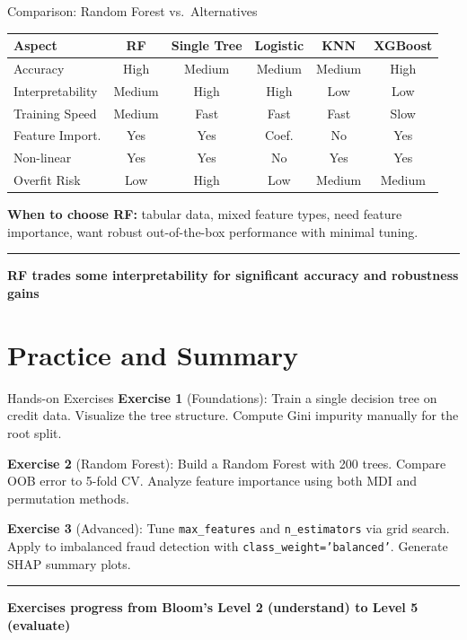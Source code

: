 \documentclass[8pt,aspectratio=169]{beamer}
\newcommand{\bottomnote}[1]{%
\vfill
\vspace{-2mm}
\textcolor{mllavender2}{\rule{\textwidth}{0.4pt}}
\vspace{1mm}
\footnotesize
\textbf{#1}
}
\begin{document}
\begin{frame}[t]{Comparison: Random Forest vs.\ Alternatives}
\begin{center}
\small
\begin{tabular}{l|ccccc}
\toprule
\textbf{Aspect} & \textbf{RF} & \textbf{Single Tree} & \textbf{Logistic} & \textbf{KNN} & \textbf{XGBoost} \\
\midrule
Accuracy & High & Medium & Medium & Medium & High \\
Interpretability & Medium & High & High & Low & Low \\
Training Speed & Medium & Fast & Fast & Fast & Slow \\
Feature Import. & Yes & Yes & Coef. & No & Yes \\
Non-linear & Yes & Yes & No & Yes & Yes \\
Overfit Risk & Low & High & Low & Medium & Medium \\
\bottomrule
\end{tabular}
\end{center}

\vspace{0.3em}
\textbf{When to choose RF:} tabular data, mixed feature types, need feature importance, want robust out-of-the-box performance with minimal tuning.
\bottomnote{RF trades some interpretability for significant accuracy and robustness gains}
\end{frame}

\section{Practice and Summary}

\begin{frame}[t]{Hands-on Exercises}
\textbf{Exercise 1} (Foundations): Train a single decision tree on credit data. Visualize the tree structure. Compute Gini impurity manually for the root split.

\vspace{0.5em}
\textbf{Exercise 2} (Random Forest): Build a Random Forest with 200 trees. Compare OOB error to 5-fold CV. Analyze feature importance using both MDI and permutation methods.

\vspace{0.5em}
\textbf{Exercise 3} (Advanced): Tune \texttt{max\_features} and \texttt{n\_estimators} via grid search. Apply to imbalanced fraud detection with \texttt{class\_weight='balanced'}. Generate SHAP summary plots.
\bottomnote{Exercises progress from Bloom's Level 2 (understand) to Level 5 (evaluate)}
\end{frame}
\end{document}
